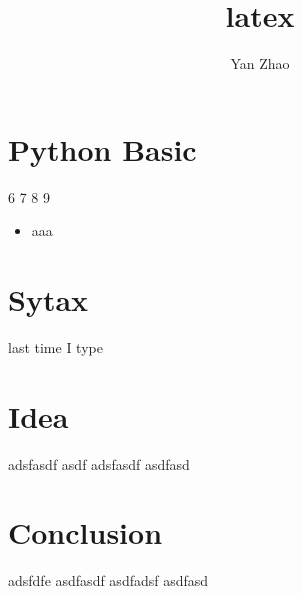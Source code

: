 \documentclass[a4paper,12pt,twoside]{book}
\begin{document}

\title{latex}
\author{Yan Zhao}
\date{}\maketitle


	
\chapter{Python Basic}

6
7
8
9


\begin{itemize}
		\item aaa
\end{itemize}

\chapter{Sytax}

last time I type



\chapter{Idea}

adsfasdf
asdf
adsfasdf
asdfasd


\chapter{Conclusion}

adsfdfe
asdfasdf
asdfadsf
asdfasd


%
\end{document}
